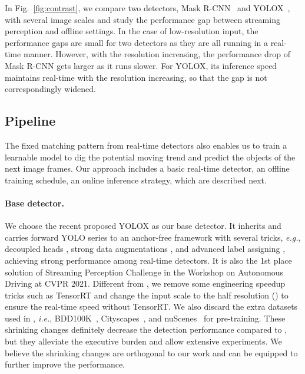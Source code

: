 \documentclass[10pt,twocolumn,letterpaper]{article}
\begin{document}
In Fig.~\ref{fig:contrast}, we compare two detectors, Mask R-CNN~\cite{maskrcnn} and YOLOX~\cite{yolox}, with several image scales and study the performance gap between streaming perception and offline settings. In the case of low-resolution input, the performance gaps are small for two detectors as they are all running in a real-time manner. However, with the resolution increasing, the performance drop of Mask R-CNN gets larger as it runs slower. For YOLOX, its inference speed maintains real-time with the resolution increasing, so that the gap is not correspondingly widened.     

\subsection{Pipeline}
\label{sec:3.2}

The fixed matching pattern from real-time detectors also enables us to train a learnable model to dig the potential moving trend and predict the objects of the next image frames. Our approach includes a basic real-time detector, an offline training schedule, an online inference strategy, which are described next.    

\paragraph{Base detector.} We choose the recent proposed YOLOX \cite{yolox} as our base detector. It inherits and carries forward YOLO series  \cite{yolo1,yolo2,yolo3} to an anchor-free framework with several tricks, \emph{e.g.}, decoupled heads \cite{head1,head2}, strong data augmentations \cite{mixup,copypaste}, and advanced label assigning \cite{ota},  achieving strong performance among real-time detectors.
It is also the 1st place solution \cite{yoloxx} of Streaming Perception Challenge in the Workshop on Autonomous Driving at CVPR 2021. Different from \cite{yoloxx}, we remove some engineering speedup tricks such as TensorRT and change the input scale to the half resolution () to ensure the real-time speed without TensorRT. We also discard the extra datasets used in \cite{yoloxx}, \emph{i.e.}, BDD100K~\cite{yu2020bdd100k}, Cityscapes~\cite{cordts2016cityscapes}, and nuScenes~\cite{caesar2020nuscenes} for pre-training. These shrinking changes definitely decrease the detection performance compared to \cite{yoloxx}, but they alleviate the executive burden and allow extensive experiments. We believe the shrinking changes are orthogonal to our work and can be equipped to further improve the performance.       
\end{document}
